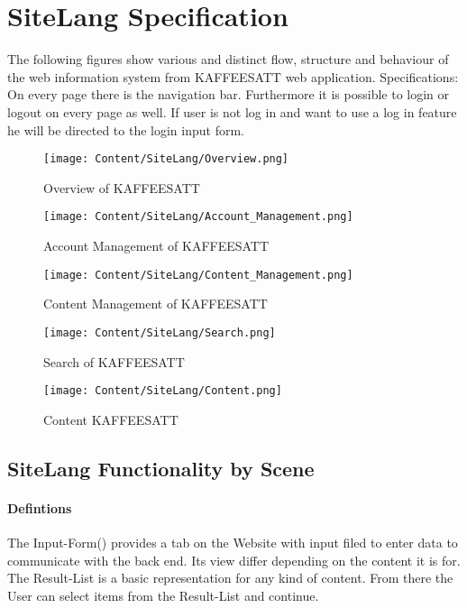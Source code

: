\section{SiteLang Specification}
The following figures show various and distinct flow, structure and behaviour of the web information system from KAFFEESATT web application.
Specifications: On every page there is the navigation bar. Furthermore it is possible to login or logout on every page as well. If user is not log in and want to use a log in feature he will be directed to the login input form.
\begin{figure}[ht]
\texttt{[image: Content/SiteLang/Overview.png]}
\caption{Overview of KAFFEESATT}
\end{figure}

\begin{figure}[ht]
\texttt{[image: Content/SiteLang/Account\_Management.png]}
\caption{Account Management of KAFFEESATT}
\end{figure}

\begin{figure}[ht]
\texttt{[image: Content/SiteLang/Content\_Management.png]}
\caption{Content Management of KAFFEESATT}
\end{figure}

\begin{figure}[ht]
\texttt{[image: Content/SiteLang/Search.png]}
\caption{Search of KAFFEESATT}
\end{figure}

\begin{figure}[ht]
\texttt{[image: Content/SiteLang/Content.png]}
\caption{Content KAFFEESATT}
\end{figure}
\clearpage



\subsection{SiteLang Functionality by Scene}
\paragraph{Defintions}
The Input-Form() provides a tab on the Website with input filed to enter data to communicate with the back end. Its view differ depending on the content it is for.\\
The Result-List is a basic representation for any kind of content. From there the User can select items from the Result-List and continue.


